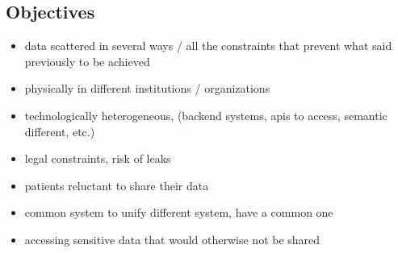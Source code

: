 
\subsection*{Objectives}






\begin{itemize}
    \item data scattered in several ways / all the constraints that prevent what said previously to be achieved
    \item physically in different institutions / organizations
    \item technologically heterogeneous, (backend systems, apis to access, semantic different, etc.)
    \item legal constraints, risk of leaks
    \item  patients reluctant to share their data
\end{itemize}

\begin{itemize}
    \item common system to unify different system, have a common one
    \item accessing sensitive data that would otherwise not be shared
\end{itemize}


